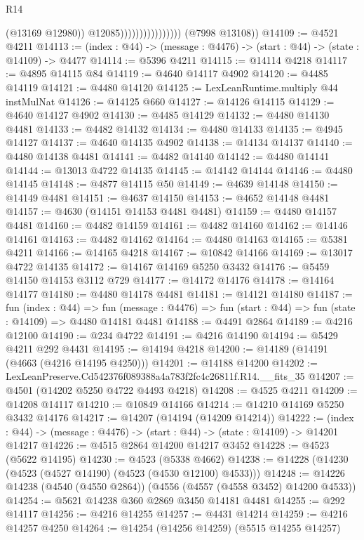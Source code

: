 \begin{lexlean}{R14}
\begin{coremodule}
                                        (@13169 @12980))
                                      @12085))))))))))))))))
      (@7998 @13108))
@14109 := @4521 @4211
@14113 := (index : @44) -> (message : @4476) -> (start : @44) -> (state : @14109) -> @4477
@14114 := @5396 @4211
@14115 := @14114 @4218
@14117 := @4895 @14115 @84
@14119 := @4640 @14117 @4902
@14120 := @4485 @14119
@14121 := @4480 @14120
@14125 := LexLeanRuntime.multiply @44 instMulNat
@14126 := @14125 @660
@14127 := @14126 @14115
@14129 := @4640 @14127 @4902
@14130 := @4485 @14129
@14132 := @4480 @14130 @4481
@14133 := @4482 @14132
@14134 := @4480 @14133
@14135 := @4945 @14127
@14137 := @4640 @14135 @4902
@14138 := @14134 @14137
@14140 := @4480 @14138 @4481
@14141 := @4482 @14140
@14142 := @4480 @14141
@14144 := @13013 @4722 @14135
@14145 := @14142 @14144
@14146 := @4480 @14145
@14148 := @4877 @14115 @50
@14149 := @4639 @14148
@14150 := @14149 @4481
@14151 := @4637 @14150
@14153 := @4652 @14148 @4481
@14157 := @4630 (@14151 @14153 @4481 @4481)
@14159 := @4480 @14157 @4481
@14160 := @4482 @14159
@14161 := @4482 @14160
@14162 := @14146 @14161
@14163 := @4482 @14162
@14164 := @4480 @14163
@14165 := @5381 @4211
@14166 := @14165 @4218
@14167 := @10842 @14166
@14169 := @13017 @4722 @14135
@14172 := @14167 @14169 @5250 @3432
@14176 := @5459 @14150 @14153 @3112 @729
@14177 := @14172 @14176
@14178 := @14164 @14177
@14180 := @4480 @14178 @4481
@14181 := @14121 @14180
@14187 := fun (index : @44) =>
  fun (message : @4476) => fun (start : @44) => fun (state : @14109) => @4480 @14181 @4481
@14188 := @4491 @2864
@14189 := @4216 @12100
@14190 := @234 @4722
@14191 := @4216 @14190
@14194 := @5429 @4211 @292 @4431
@14195 := @14194 @4218
@14200 := @14189 (@14191 (@4663 (@4216 @14195 @4250)))
@14201 := @14188 @14200
@14202 := LexLeanPreserve.Cd542376f089388a4a783f2fc4c26811f.R14.__fits_35
@14207 := @4501 (@14202 @5250 @4722 @4493 @4218)
@14208 := @4525 @4211
@14209 := @14208 @14117
@14210 := @10849 @14166
@14214 := @14210 @14169 @5250 @3432 @14176
@14217 := @14207 (@14194 (@14209 @14214))
@14222 := (index : @44) -> (message : @4476) -> (start : @44) -> (state : @14109) -> @14201 @14217
@14226 := @4515 @2864 @14200 @14217 @3452
@14228 := @4523 (@5622 @14195)
@14230 := @4523 (@5338 @4662)
@14238 := @14228 (@14230 (@4523 (@4527 @14190) (@4523 (@4530 @12100) @4533)))
@14248 := @14226 @14238 (@4540 (@4550 @2864)) (@4556 (@4557 (@4558 @3452) @14200 @4533))
@14254 := @5621 @14238 @360 @2869 @3450 @14181 @4481
@14255 := @292 @14117
@14256 := @4216 @14255
@14257 := @4431 @14214
@14259 := @4216 @14257 @4250
@14264 := @14254 (@14256 @14259) (@5515 @14255 @14257)

\end{coremodule}
\end{lexlean}
